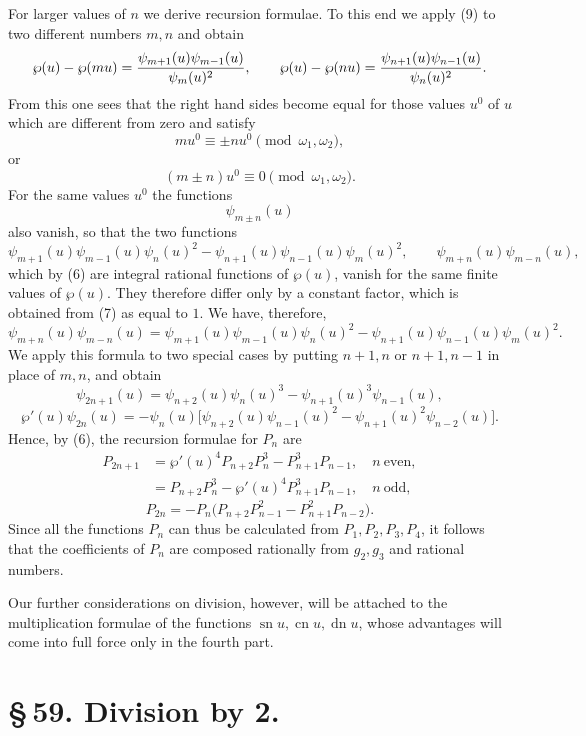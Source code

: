 \documentclass[11pt]{article}
\providecommand{\sn}{\operatorname{sn}}
\providecommand{\cn}{\operatorname{cn}}
\providecommand{\dn}{\operatorname{dn}}
\begin{document}
For larger values of $n$ we derive recursion formulae. To this end we apply (9) to two
different numbers $m,n$ and obtain
\[
\wp(u)-\wp(mu)={\psi_{m+1}(u)\psi_{m-1}(u)\over\psi_m(u)^2},\qquad
\wp(u)-\wp(nu)={\psi_{n+1}(u)\psi_{n-1}(u)\over\psi_n(u)^2}.
\]
From this one sees that the right hand sides become equal for those values $u^0$ of $u$
which are different from zero and satisfy
\[
mu^0\equiv \pm nu^0\pmod{\omega_1,\omega_2},
\]
or
\[
(m\pm n)u^0\equiv0\pmod{\omega_1,\omega_2}.
\]
For the same values $u^0$ the functions
\[
\psi_{m\pm n}(u)
\]
also vanish, so that the two functions
\[
\psi_{m+1}(u)\psi_{m-1}(u)\psi_n(u)^2
-\psi_{n+1}(u)\psi_{n-1}(u)\psi_m(u)^2,\qquad
\psi_{m+n}(u)\psi_{m-n}(u),
\]
which by (6) are integral rational functions of $\wp(u)$, vanish for the same finite
values of $\wp(u)$. They therefore differ only by a constant factor, which is obtained
from (7) as equal to $1$. We have, therefore,
\begin{equation}
\psi_{m+n}(u)\psi_{m-n}(u)
=\psi_{m+1}(u)\psi_{m-1}(u)\psi_n(u)^2
-\psi_{n+1}(u)\psi_{n-1}(u)\psi_m(u)^2.
\tag{14}
\end{equation}
We apply this formula to two special cases by putting $n+1,n$ or $n+1,n-1$ in place of
$m,n$, and obtain
\[
\psi_{2n+1}(u)=\psi_{n+2}(u)\psi_n(u)^3-\psi_{n+1}(u)^3\psi_{n-1}(u),
\]
\[
\wp'(u)\psi_{2n}(u)=
-\psi_n(u)\bigl[\psi_{n+2}(u)\psi_{n-1}(u)^2
-\psi_{n+1}(u)^2\psi_{n-2}(u)\bigr].
\]
Hence, by (6), the recursion formulae for $P_n$ are
\begin{equation}
\begin{aligned}
P_{2n+1}&=\wp'(u)^4P_{n+2}P_n^3-P_{n+1}^3P_{n-1},\quad n\ \text{even},\\
&=P_{n+2}P_n^3-\wp'(u)^4P_{n+1}^3P_{n-1},\quad n\ \text{odd},
\end{aligned}
\tag{15}
\end{equation}
\begin{equation}
P_{2n}=-P_n\bigl(P_{n+2}P_{n-1}^2-P_{n+1}^2P_{n-2}\bigr).
\tag{16}
\end{equation}
Since all the functions $P_n$ can thus be calculated from $P_1,P_2,P_3,P_4$, it follows
that the coefficients of $P_n$ are composed rationally from $g_2,g_3$ and rational numbers.

Our further considerations on division, however, will be attached to the multiplication
formulae of the functions $\sn u,\cn u,\dn u$, whose advantages will come into full force
only in the fourth part.

\section*{\S\,59. Division by 2.}
\end{document}
